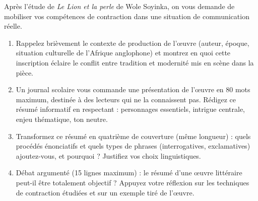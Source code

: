 \documentclass[11pt]{article}
\begin{document}
\begin{exercice}
Après l'étude de \emph{Le Lion et la perle} de Wole Soyinka, on vous demande de mobiliser vos compétences de contraction dans une situation de communication réelle.

\begin{enumerate}
\item Rappelez brièvement le contexte de production de l'œuvre (auteur, époque, situation culturelle de l'Afrique anglophone) et montrez en quoi cette inscription éclaire le conflit entre tradition et modernité mis en scène dans la pièce.
\item Un journal scolaire vous commande une présentation de l'œuvre en 80 mots maximum, destinée à des lecteurs qui ne la connaissent pas. Rédigez ce résumé informatif en respectant : personnages essentiels, intrigue centrale, enjeu thématique, ton neutre.
\item Transformez ce résumé en quatrième de couverture (même longueur) : quels procédés énonciatifs et quels types de phrases (interrogatives, exclamatives) ajoutez-vous, et pourquoi ? Justifiez vos choix linguistiques.
\item Débat argumenté (15 lignes maximum) : le résumé d'une œuvre littéraire peut-il être totalement objectif ? Appuyez votre réflexion sur les techniques de contraction étudiées et sur un exemple tiré de l'œuvre.
\end{enumerate}
\end{exercice}
\end{document}
